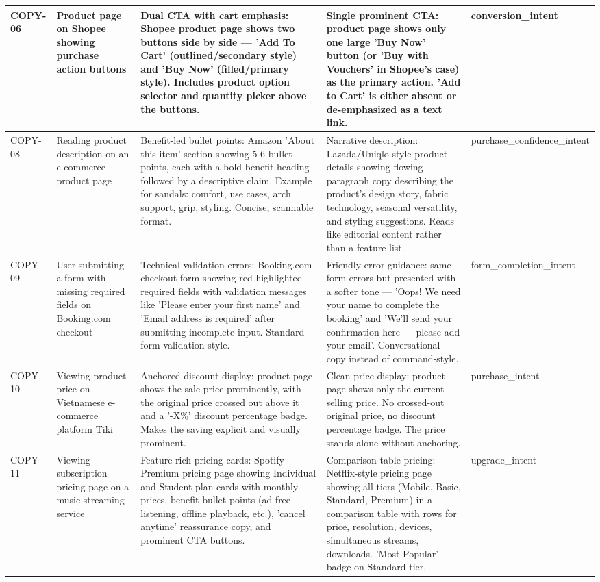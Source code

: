 \begin{table}[h]
\begin{tabular}{p{1.5cm} p{3.5cm} p{4cm} p{4cm} p{2cm}}
\midrule
COPY-06 & Product page on Shopee showing purchase action buttons & Dual CTA with cart emphasis: Shopee product page shows two buttons side by side — 'Add To Cart' (outlined/secondary style) and 'Buy Now' (filled/primary style). Includes product option selector and quantity picker above the buttons. & Single prominent CTA: product page shows only one large 'Buy Now' button (or 'Buy with Vouchers' in Shopee's case) as the primary action. 'Add to Cart' is either absent or de-emphasized as a text link. & conversion_intent \\
\midrule
COPY-08 & Reading product description on an e-commerce product page & Benefit-led bullet points: Amazon 'About this item' section showing 5-6 bullet points, each with a bold benefit heading followed by a descriptive claim. Example for sandals: comfort, use cases, arch support, grip, styling. Concise, scannable format. & Narrative description: Lazada/Uniqlo style product details showing flowing paragraph copy describing the product's design story, fabric technology, seasonal versatility, and styling suggestions. Reads like editorial content rather than a feature list. & purchase_confidence_intent \\
\midrule
COPY-09 & User submitting a form with missing required fields on Booking.com checkout & Technical validation errors: Booking.com checkout form showing red-highlighted required fields with validation messages like 'Please enter your first name' and 'Email address is required' after submitting incomplete input. Standard form validation style. & Friendly error guidance: same form errors but presented with a softer tone — 'Oops! We need your name to complete the booking' and 'We'll send your confirmation here — please add your email'. Conversational copy instead of command-style. & form_completion_intent \\
\midrule
COPY-10 & Viewing product price on Vietnamese e-commerce platform Tiki & Anchored discount display: product page shows the sale price prominently, with the original price crossed out above it and a '-X\%' discount percentage badge. Makes the saving explicit and visually prominent. & Clean price display: product page shows only the current selling price. No crossed-out original price, no discount percentage badge. The price stands alone without anchoring. & purchase_intent \\
\midrule
COPY-11 & Viewing subscription pricing page on a music streaming service & Feature-rich pricing cards: Spotify Premium pricing page showing Individual and Student plan cards with monthly prices, benefit bullet points (ad-free listening, offline playback, etc.), 'cancel anytime' reassurance copy, and prominent CTA buttons. & Comparison table pricing: Netflix-style pricing page showing all tiers (Mobile, Basic, Standard, Premium) in a comparison table with rows for price, resolution, devices, simultaneous streams, downloads. 'Most Popular' badge on Standard tier. & upgrade_intent \\

\end{tabular}
\end{table}
